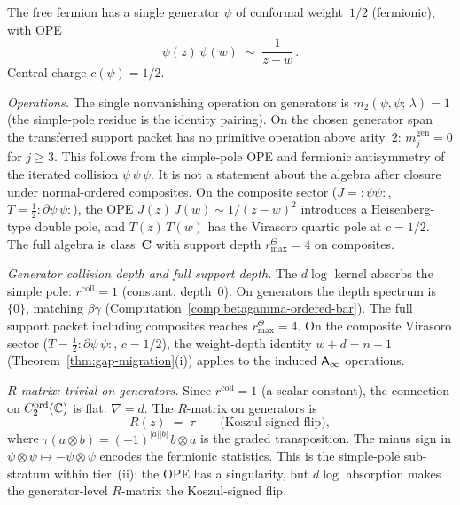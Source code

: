 \begin{computation}%
\label{comp:free-fermion-ordered-bar}%
%
%
%
The free fermion has a single generator $\psi$ of conformal
weight~$1/2$ (fermionic), with OPE
\begin{equation}\label{eq:free-fermion-ope}
\psi(z)\,\psi(w) \;\sim\; \frac{1}{z-w}\,.
\end{equation}
Central charge $c(\psi) = 1/2$.

\smallskip
\noindent
\emph{Operations.}
The single nonvanishing operation on generators is
$m_2(\psi,\psi;\,\lambda) = 1$
(the simple-pole residue is the identity pairing).
On the chosen generator span the transferred support packet has no
primitive operation above arity~$2$:
$m^{\mathrm{gen}}_j=0$ for $j\ge3$. This follows from the
simple-pole OPE and fermionic antisymmetry of the iterated collision
$\psi\,\psi\,\psi$. It is not a statement about the algebra after
closure under normal-ordered composites. On the composite sector
($J = {:}\psi\psi{:}$, $T = \tfrac{1}{2}{:}\partial\psi\,\psi{:}$),
the OPE $J(z)\,J(w) \sim 1/(z-w)^2$ introduces a
Heisenberg-type double pole, and $T(z)\,T(w)$ has the
Virasoro quartic pole at $c = 1/2$. The full algebra is
class~$\mathbf{C}$ with support depth $r^\Theta_{\max}=4$ on
composites.

\smallskip
\noindent
\emph{Generator collision depth and full support depth.}
The $d\log$ kernel absorbs the simple pole:
$r^{\mathrm{coll}} = 1$ (constant, depth~$0$).
On generators the depth spectrum is $\{0\}$, matching
$\beta\gamma$ (Computation~\ref{comp:betagamma-ordered-bar}).
The full support packet including composites reaches
$r^\Theta_{\max}=4$.
On the composite Virasoro sector ($T = \tfrac{1}{2}{:}\partial\psi\,\psi{:}$, $c = 1/2$), the weight-depth identity $w + d = n - 1$ (Theorem~\ref{thm:gap-migration}(i)) applies to the induced $\mathsf{A}_{\infty}$ operations.

\smallskip
\noindent
\emph{$R$-matrix: trivial on generators.}
Since $r^{\mathrm{coll}} = 1$ (a scalar constant), the connection
on $C_2^{\mathrm{ord}}(\mathbb{C})$ is flat: $\nabla = d$.
The $R$-matrix on generators is
\begin{equation}\label{eq:free-fermion-R}
R(z) \;=\; \tau \qquad\text{(Koszul-signed flip)},
\end{equation}
where $\tau(a \otimes b) = (-1)^{|a||b|}\,b \otimes a$ is the
graded transposition. The minus sign in
$\psi \otimes \psi \mapsto -\psi \otimes \psi$
encodes the fermionic statistics. This is the simple-pole
sub-stratum within tier~(ii): the OPE has a singularity,
but $d\log$ absorption makes the generator-level
$R$-matrix the Koszul-signed flip.


\end{computation}
